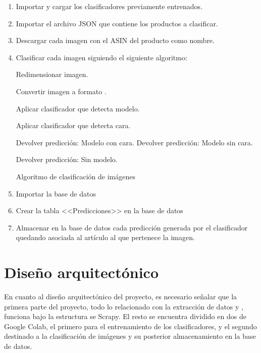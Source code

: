 \begin{enumerate}
    \item Importar y cargar los clasificadores previamente entrenados.
    \item Importar el archivo JSON que contiene los productos a clasificar.
    \item Descargar cada imagen con el ASIN del producto como nombre.
    \item Clasificar cada imagen siguiendo el siguiente algoritmo:
    
        \FloatBarrier
        \begin{algorithm}[!h]
            	{
            	Redimensionar imagen.
            	
            	Convertir imagen a formato .
            	
            	Aplicar clasificador que detecta modelo.
            	
            		{
            			Aplicar clasificador que detecta cara.
            			
            		    {
            			Devolver predicción: Modelo con cara.
            		    }
            		    Devolver predicción: Modelo sin cara.
            		}
            	    Devolver predicción: Sin modelo.
            	}
            \caption{Algoritmo de clasificación de imágenes}
            \label{Alg:}
        \end{algorithm}
        \FloatBarrier
        
    \item Importar la base de datos
    \item Crear la tabla <<Predicciones>> en la base de datos
    \item Almacenar en la base de datos cada predicción generada por el clasificador quedando asociada al artículo al que pertenece la imagen.
            
\end{enumerate}

\section{Diseño arquitectónico}
 En cuanto al diseño arquitectónico del proyecto, es necesario señalar que la primera parte del proyecto, todo lo relacionado con la extracción de datos y , funciona bajo la estructura se Scrapy. El resto se encuentra dividido en dos  de Google Colab, el primero para el entrenamiento de los clasificadores, y el segundo destinado a la clasificación de imágenes y su posterior almacenamiento en la base de datos.
 

